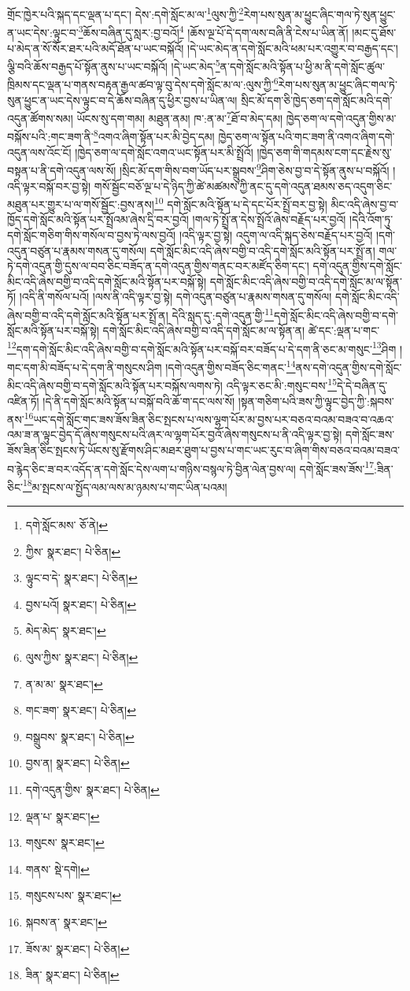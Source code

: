 གྲོང་ཁྱེར་པའི་སྐད་དང་ལྡན་པ་དང་། དེས་:དགེ་སློང་མ་ལ་\footnote{དགེ་སློང་མས་  ཅོ་ནེ། }ལུས་ཀྱི་\footnote{ཀྱིས་  སྣར་ཐང་།  པེ་ཅིན། }རེག་པས་སུན་མ་ཕྱུང་ཞིང་གལ་ཏེ་སུན་ཕྱུང་ན་ཡང་དེས་:ལྟུང་བ་\footnote{ལྟུང་བ་དེ་  སྣར་ཐང་།  པེ་ཅིན། }ཆོས་བཞིན་དུ་སླར་:བྱ་བའོ།\footnote{བྱས་པའོ།  སྣར་ཐང་།  པེ་ཅིན། } །ཆོས་ལྔ་པོ་དེ་དག་ལས་བཞི་ནི་ངེས་པ་ཡིན་ནོ། །མང་དུ་ཐོས་པ་མེད་ན་སོ་སོར་ཐར་པའི་མདོ་ཐོན་པ་ཡང་བསྐོའོ། །དེ་ཡང་མེད་ན་དགེ་སློང་མའི་ཕམ་པར་འགྱུར་བ་བརྒྱད་དང་། ལྕི་བའི་ཆོས་བརྒྱད་པོ་སྟོན་ནུས་པ་ཡང་བསྐོའོ། །དེ་ཡང་མེད་\footnote{མེད་མེད་  སྣར་ཐང་། }ན་དགེ་སློང་མའི་སྟོན་པ་ཕྱི་མ་ནི་དགེ་སློང་ཚུལ་ཁྲིམས་དང་ལྡན་པ་གནས་བརྟན་རྒྱལ་ཚབ་ལྟ་བུ་དེས་དགེ་སློང་མ་ལ་:ལུས་ཀྱི་\footnote{ལུས་ཀྱིས་  སྣར་ཐང་།  པེ་ཅིན། }རེག་པས་སུན་མ་ཕྱུང་ཞིང་གལ་ཏེ་སུན་ཕྱུང་ན་ཡང་དེས་ལྟུང་བ་དེ་ཆོས་བཞིན་དུ་ཕྱིར་བྱས་པ་ཡིན་ལ། སྲིང་མོ་དག་ཅི་ཁྱེད་ཅག་དགེ་སློང་མའི་དགེ་འདུན་ཚོགས་སམ། ཡོངས་སུ་དག་གམ། མཐུན་ནམ། ཁ་:ན་མ་\footnote{ན་མ་མ་  སྣར་ཐང་། }ཐོ་བ་མེད་དམ། ཁྱེད་ཅག་ལ་དགེ་འདུན་གྱིས་མ་བསྐོས་པའི་:གང་ཟག་ནི་\footnote{གང་ཟག་  སྣར་ཐང་།  པེ་ཅིན། }འགའ་ཞིག་སྟོན་པར་མི་བྱེད་དམ། ཁྱེད་ཅག་ལ་སྟོན་པའི་གང་ཟག་ནི་འགའ་ཞིག་དགེ་འདུན་ལས་འོང་ངོ། །ཁྱེད་ཅག་ལ་དགེ་སློང་འགའ་ཡང་སྟོན་པར་མི་སྤྲོའོ། །ཁྱེད་ཅག་གི་གདམས་ངག་དང་རྗེས་སུ་བསྟན་པ་ནི་དགེ་འདུན་ལས་སོ། །སྲིང་མོ་དག་གིས་བག་ཡོད་པར་སྒྲུབས་\footnote{བསྒྲུབས་  སྣར་ཐང་།  པེ་ཅིན། }ཤིག་ཅེས་བྱ་བ་དེ་སྟོན་ནུས་པ་བསྐོའོ། །འདི་ལྟར་བསྐོ་བར་བྱ་སྟེ། གསོ་སྦྱོང་བཅོ་ལྔ་པ་དེ་ཉིད་ཀྱི་ཚེ་མཚམས་ཀྱི་ནང་དུ་དགེ་འདུན་ཐམས་ཅད་འདུག་ཅིང་མཐུན་པར་གྱུར་པ་ལ་གསོ་སྦྱོང་:བྱས་ནས།\footnote{བྱས་ན།  སྣར་ཐང་།  པེ་ཅིན། } དགེ་སློང་མའི་སྟོན་པ་དེ་དང་པོར་སྤྲོ་བར་བྱ་སྟེ། མིང་འདི་ཞེས་བྱ་བ་ཁྱོད་དགེ་སློང་མའི་སྟོན་པར་སྤྲོའམ་ཞེས་དྲི་བར་བྱའོ། །གལ་ཏེ་སྤྲོ་ན་དེས་སྤྲོའོ་ཞེས་བརྗོད་པར་བྱའོ། །དེའི་འོག་ཏུ་དགེ་སློང་གཅིག་གིས་གསོལ་བ་བྱས་ཏེ་ལས་བྱའོ། །འདི་ལྟར་བྱ་སྟེ། འདུག་ལ་འདི་སྐད་ཅེས་བརྗོད་པར་བྱའོ། །དགེ་འདུན་བཙུན་པ་རྣམས་གསན་དུ་གསོལ། དགེ་སློང་མིང་འདི་ཞེས་བགྱི་བ་འདི་དགེ་སློང་མའི་སྟོན་པར་སྤྲོ་ན། གལ་ཏེ་དགེ་འདུན་གྱི་དུས་ལ་བབ་ཅིང་བཟོད་ན་དགེ་འདུན་གྱིས་གནང་བར་མཛོད་ཅིག་དང་། དགེ་འདུན་གྱིས་དགེ་སློང་མིང་འདི་ཞེས་བགྱི་བ་འདི་དགེ་སློང་མའི་སྟོན་པར་བསྐོ་སྟེ། དགེ་སློང་མིང་འདི་ཞེས་བགྱི་བ་འདི་དགེ་སློང་མ་ལ་སྟོན་ཏོ། །འདི་ནི་གསོལ་པའོ། །ལས་ནི་འདི་ལྟར་བྱ་སྟེ། དགེ་འདུན་བཙུན་པ་རྣམས་གསན་དུ་གསོལ། དགེ་སློང་མིང་འདི་ཞེས་བགྱི་བ་འདི་དགེ་སློང་མའི་སྟོན་པར་སྤྲོ་ན། དེའི་སླད་དུ་:དགེ་འདུན་གྱི་\footnote{དགེ་འདུན་གྱིས་  སྣར་ཐང་།  པེ་ཅིན། }དགེ་སློང་མིང་འདི་ཞེས་བགྱི་བ་དགེ་སློང་མའི་སྟོན་པར་བསྐོ་སྟེ། དགེ་སློང་མིང་འདི་ཞེས་བགྱི་བ་འདི་དགེ་སློང་མ་ལ་སྟོན་ན། ཚེ་དང་:ལྡན་པ་གང་\footnote{ལྡན་པ་  སྣར་ཐང་། }དག་དགེ་སློང་མིང་འདི་ཞེས་བགྱི་བ་དགེ་སློང་མའི་སྟོན་པར་བསྐོ་བར་བཟོད་པ་དེ་དག་ནི་ཅང་མ་གསུང་\footnote{གསུངས་  སྣར་ཐང་། }ཤིག །གང་དག་མི་བཟོད་པ་དེ་དག་ནི་གསུངས་ཤིག །དགེ་འདུན་གྱིས་བཟོད་ཅིང་གནང་\footnote{གནས་  སྡེ་དགེ། }ནས་དགེ་འདུན་གྱིས་དགེ་སློང་མིང་འདི་ཞེས་བགྱི་བ་དགེ་སློང་མའི་སྟོན་པར་བསྐོས་ལགས་ཏེ། འདི་ལྟར་ཅང་མི་:གསུང་བས་\footnote{གསུངས་པས་  སྣར་ཐང་། }དེ་དེ་བཞིན་དུ་འཛིན་ཏོ། །དེ་ནི་དགེ་སློང་མའི་སྟོན་པ་བསྐོ་བའི་ཆོ་ག་དང་ལས་སོ། །སྟན་གཅིག་པའི་ཟས་ཀྱི་ལྟུང་བྱེད་ཀྱི་:སྐབས་ནས་\footnote{སྐབས་ན་  སྣར་ཐང་། }ཡང་དགེ་སློང་གང་ཟས་ཟོས་ཟིན་ཅིང་སྤངས་པ་ལས་ལྷག་པོར་མ་བྱས་པར་བཅའ་བའམ་བཟའ་བ་འཆའ་འམ་ཟ་ན་ལྟུང་བྱེད་དོ་ཞེས་གསུངས་པའི་ཞར་ལ་ལྷག་པོར་བྱའོ་ཞེས་གསུངས་པ་ནི་འདི་ལྟར་བྱ་སྟེ། དགེ་སློང་ཟས་ཟོས་ཟིན་ཅིང་སྤངས་ཏེ་ཡོངས་སུ་རྫོགས་ཤིང་མཐར་ཐུག་པ་བྱས་པ་གང་ཡང་རུང་བ་ཞིག་གིས་བཅའ་བའམ་བཟའ་བ་རྙེད་ཅིང་ཟ་བར་འདོད་ན་དགེ་སློང་དེས་ལག་པ་གཉིས་བསྙལ་ཏེ་བྱིན་ལེན་བྱས་ལ། དགེ་སློང་ཟས་ཟོས་\footnote{ཟོས་མ་  སྣར་ཐང་།  པེ་ཅིན། }:ཟིན་ཅིང་\footnote{ཟིན་  སྣར་ཐང་།  པེ་ཅིན། }མ་སྤངས་ལ་སྤྱོད་ལམ་ལས་མ་ཉམས་པ་གང་ཡིན་པའམ། 